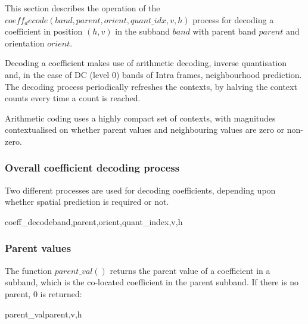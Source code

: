 \label{wltcoeff}

This section describes the operation of the 
$coeff_decode(band,parent,orient,quant\_idx,v,h)$ process
for decoding a coefficient in position $(h,v)$ in the subband $band$ with
parent band $parent$ and orientation $orient$.

Decoding a coefficient makes use of arithmetic decoding, inverse quantisation
and, in the case of DC (level 0) bands of Intra frames, neighbourhood prediction.
The decoding process periodically refreshes the contexts, by
halving the context counts every time a count is reached.

Arithmetic coding uses a highly compact set of contexts, 
with magnitudes contextualised on whether parent values
and neighbouring values are zero or non-zero.

\subsubsection{Overall coefficient decoding process}

Two different processes are used for decoding coefficients, depending
upon whether spatial prediction is required or not.

\begin{pseudo}{coeff\_decode}{band,parent,orient,quant\_index,v,h}
\end{pseudo}


\subsubsection{Parent values}
\label{parentval}
The function $parent\_val()$ returns the parent value of a coefficient in a subband,
which is the co-located coefficient in the parent subband. If there is no parent,
$0$ is returned:

\begin{pseudo}{parent\_val}{parent,v,h}
  \bsELSE
  \bsEND
\end{pseudo}

